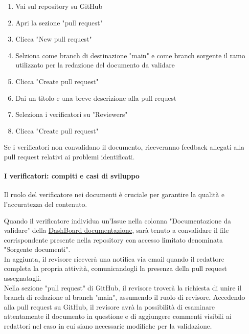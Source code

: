 \documentclass{article}
\begin{document}
    \begin{enumerate}
        \item Vai sul repository su GitHub
        \item Apri la sezione "pull request"
        \item Clicca "New pull request"
        \item Selziona come branch di destinazione "main" e come branch sorgente il ramo utilizzato per la redazione del documento da validare
        \item Clicca "Create pull request"
        \item Dai un titolo e una breve descrizione alla pull request
        \item Seleziona i verificatori su "Reviewers"
        \item Clicca "Create pull request"
    \end{enumerate}
    
   Se i verificatori non convalidano il documento, riceveranno feedback allegati alla pull request relativi ai problemi identificati.

    \paragraph{I verificatori: compiti e casi di sviluppo}\label{sec:verificatori}

    Il ruolo del verificatore nei documenti è cruciale per garantire la qualità e l'accuratezza del contenuto.

Quando il verificatore individua un'Issue nella colonna "Documentazione da validare" della  \href{https://github.com/orgs/ByteOps-swe/projects/1/views/1}{DashBoard documentazione}, sarà tenuto a convalidare il file corrispondente presente nella repository con accesso limitato denominata "Sorgente documenti". \\
In aggiunta, il revisore riceverà una notifica via email quando il redattore completa la propria attività, comunicandogli la presenza della pull request assegnatagli.\\
Nella sezione "pull request" di GitHub, il revisore troverà la richiesta di unire il branch di redazione al branch "main", assumendo il ruolo di revisore. Accedendo alla pull request su GitHub, il revisore avrà la possibilità di esaminare attentamente il documento in questione e di aggiungere commenti visibili ai redattori nel caso in cui siano necessarie modifiche per la validazione.

\vspace{0.3cm}
\end{document}
